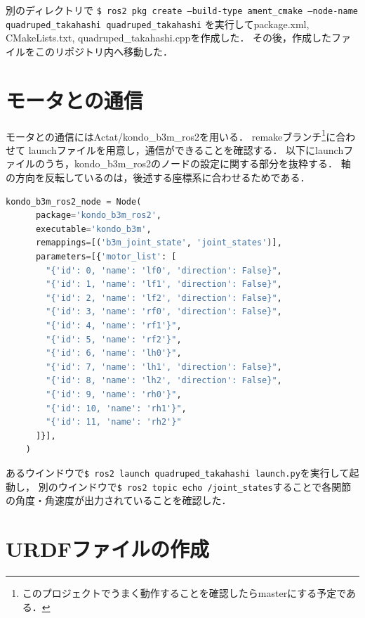 \documentclass[a4paper]{jlreq}
\begin{document}
  別のディレクトリで
  \texttt{\$ ros2 pkg create --build-type ament\_cmake --node-name quadruped\_takahashi quadruped\_takahashi}
  を実行してpackage.xml, CMakeLists.txt, quadruped\_takahashi.cppを作成した．
  その後，作成したファイルをこのリポジトリ内へ移動した．

  \section{モータとの通信}

  モータとの通信にはActat/kondo\_b3m\_ros2を用いる．
  remakeブランチ\footnote{このプロジェクトでうまく動作することを確認したらmasterにする予定である．}に合わせて
  launchファイルを用意し，通信ができることを確認する．
  以下にlaunchファイルのうち，kondo\_b3m\_ros2のノードの設定に関する部分を抜粋する．
  軸の方向を反転しているのは，後述する座標系に合わせるためである．

  \begin{lstlisting}[basicstyle=\ttfamily, language=Python]
    kondo_b3m_ros2_node = Node(
      package='kondo_b3m_ros2',
      executable='kondo_b3m',
      remappings=[('b3m_joint_state', 'joint_states')],
      parameters=[{'motor_list': [
        "{'id': 0, 'name': 'lf0', 'direction': False}",
        "{'id': 1, 'name': 'lf1', 'direction': False}",
        "{'id': 2, 'name': 'lf2', 'direction': False}",
        "{'id': 3, 'name': 'rf0', 'direction': False}",
        "{'id': 4, 'name': 'rf1'}",
        "{'id': 5, 'name': 'rf2'}",
        "{'id': 6, 'name': 'lh0'}",
        "{'id': 7, 'name': 'lh1', 'direction': False}",
        "{'id': 8, 'name': 'lh2', 'direction': False}",
        "{'id': 9, 'name': 'rh0'}",
        "{'id': 10, 'name': 'rh1'}",
        "{'id': 11, 'name': 'rh2'}"
      ]}],
    )
  \end{lstlisting}

  あるウインドウで\texttt{\$ ros2 launch quadruped\_takahashi launch.py}を実行して起動し，
  別のウインドウで\texttt{\$ ros2 topic echo /joint\_states}することで各関節の角度・角速度が出力されていることを確認した．

  \section{URDFファイルの作成}
\end{document}
